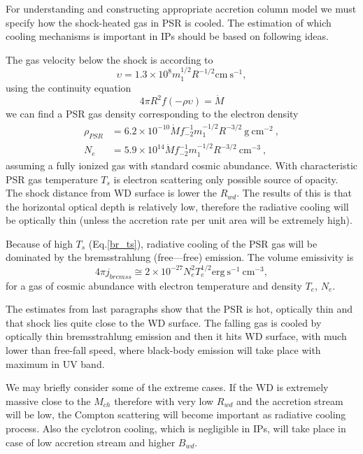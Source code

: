 \documentclass[oneside,a4paper,11pt]{report}
\begin{document}
For understanding and constructing appropriate accretion column model we must specify how the shock-heated 
gas in PSR is cooled. The estimation of which cooling mechanisms is important in IPs should be based on 
following ideas. 

The gas velocity below the shock is according to \cite{accpower:1} 
\begin{equation}
\upsilon = 1.3 \times 10^8 m_1^{1/2}R^{-1/2} \mathrm{cm \: s^{-1}}, 
\end{equation}
using the continuity equation 
\begin{equation}
 4\pi R^2 f(- \rho \upsilon) = \dot{M}
\end{equation}
we can find a PSR gas density corresponding to the electron density
\begin{equation}
 \label{gas_el_den_PSR}
\begin{split}
\rho_{PSR} &= 6.2 \times 10^{-10} \dot{M}f_{-2}^{-1}m_1^{-1/2}R^{-3/2} \: \mathrm{g \: cm^{-2}} \:, \\
N_e &= 5.9 \times 10^{14} \dot{M} f_{-2}^{-1}m_1^{-1/2}R^{-3/2} \: \mathrm{cm^{-3}} \:, 
\end{split}
\end{equation}
assuming a fully ionized gas with standard cosmic abundance. 
With characteristic PSR gas temperature $T_s$ is electron scattering only possible source of opacity. 
The shock distance from WD surface is lower the $R_{wd}$. The results of this is that the horizontal optical 
depth is relatively low, therefore the radiative cooling will be optically thin (unless the accretion 
rate per unit area will be extremely high).   
  
Because of high $T_s$ (Eq.\eqref{br_ts}), radiative cooling of the PSR gas will be dominated by the 
bremsstrahlung (free—free) emission. The volume emissivity is
\begin{equation}
4\pi j_{bremss} \cong 2 \times 10^{-27} N_e^2 T_e^{1/2} \mathrm{erg \:s^{-1} \: cm^{-3}}, 
\end{equation}
for a gas of cosmic abundance with electron temperature and density $T_e$, $N_e$.  

The estimates from last paragraphs show that the PSR is hot, optically thin and that shock lies quite 
close to the WD surface. The falling gas is cooled by optically thin bremsstrahlung emission and then 
it hits WD surface, with much lower than free-fall speed, where black-body emission will take place 
with maximum in UV band.   

We may briefly consider some of the extreme cases. If the WD is extremely massive close to the $M_{ch}$ 
therefore with very low $R_{wd}$ and the accretion stream will be low, the Compton scattering will 
become important as radiative cooling process. Also the cyclotron cooling, which is negligible in 
IPs, will take place in case of low accretion stream and higher $B_{wd}$.   
\end{document}
